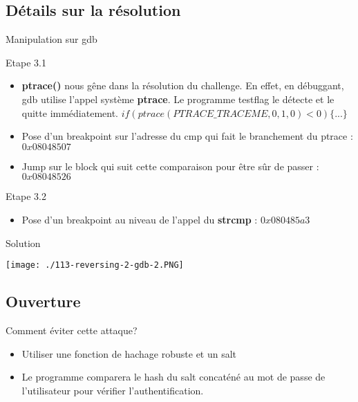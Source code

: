 \documentclass{beamer}
\begin{document}
	\subsection{Détails sur la résolution}
	
	\begin{frame}{Manipulation sur gdb}
		\begin{block}{Etape 3.1}
			\begin{itemize}
				\item \textbf{ptrace()} nous gêne dans la résolution du challenge. En effet, en débuggant, gdb utilise l'appel système \textbf{ptrace}. Le programme testflag le détecte et le quitte immédiatement. \newline
					\tiny{$if (ptrace(PTRACE\_TRACEME, 0, 1, 0) < 0)\{...\}$}
				\normalsize\item Pose d'un breakpoint sur l'adresse du cmp qui fait le branchement du ptrace : $0x08048507$
				\item Jump sur le block qui suit cette comparaison pour être sûr de passer : $0x08048526$
			\end{itemize}
		\end{block}
		\begin{block}{Etape 3.2}
			\begin{itemize}
				\item Pose d'un breakpoint au niveau de l'appel du \textbf{strcmp} : $0x080485a3$
			\end{itemize}
		\end{block}
	\end{frame}

	\begin{frame}{Solution}
		\begin{center}
			\texttt{[image: ./113-reversing-2-gdb-2.PNG]}
		\end{center}
	\end{frame}

	\subsection{Ouverture}

	\begin{frame}
	\begin{block}{Comment éviter cette attaque?}
		\begin{itemize}
		\item Utiliser une fonction de hachage robuste et un salt 
		\item Le programme comparera le hash du salt concaténé au mot de passe de l'utilisateur pour vérifier l'authentification. 
		\end{itemize}
	\end{block}
\end{frame}

      
\end{document}
